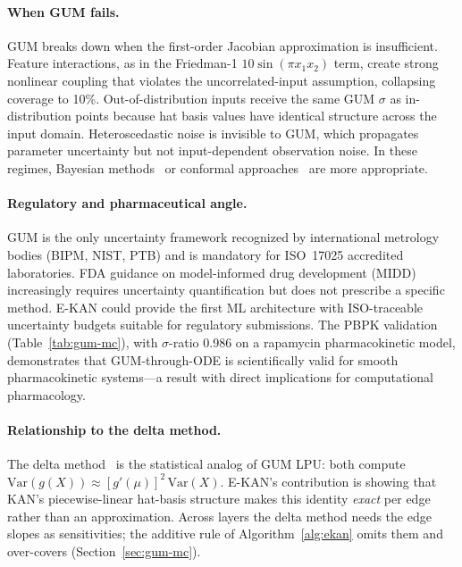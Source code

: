\documentclass{article}
\begin{document}
\paragraph{When GUM fails.}
GUM breaks down when the first-order Jacobian approximation is insufficient.
Feature interactions, as in the Friedman-1 $10\sin(\pi x_1 x_2)$ term,
create strong nonlinear coupling that violates the uncorrelated-input
assumption, collapsing coverage to 10\%.  Out-of-distribution inputs receive
the same GUM $\sigma$ as in-distribution points because hat basis values have
identical structure across the input domain.  Heteroscedastic noise is
invisible to GUM, which propagates parameter uncertainty but not
input-dependent observation noise.  In these regimes, Bayesian
methods~\citep{hassan2024bayeskan} or conformal
approaches~\citep{mollaali2025conformal} are more appropriate.

\paragraph{Regulatory and pharmaceutical angle.}
GUM is the only uncertainty framework recognized by international metrology
bodies (BIPM, NIST, PTB) and is mandatory for ISO~17025 accredited
laboratories.  FDA guidance on model-informed drug development (MIDD)
increasingly requires uncertainty quantification but does not prescribe a
specific method.  E-KAN could provide the first ML architecture with
ISO-traceable uncertainty budgets suitable for regulatory submissions.  The
PBPK validation (Table~\ref{tab:gum-mc}), with $\sigma$-ratio 0.986 on a
rapamycin pharmacokinetic model, demonstrates that GUM-through-ODE is
scientifically valid for smooth pharmacokinetic systems---a result with direct
implications for computational pharmacology.

\paragraph{Relationship to the delta method.}
The delta method~\citep{oehlert1992delta} is the statistical analog of GUM
LPU: both compute
$\mathrm{Var}(g(X)) \approx [g'(\mu)]^2 \,\mathrm{Var}(X)$.  E-KAN's
contribution is showing that KAN's piecewise-linear hat-basis structure makes
this identity \emph{exact} per edge rather than an approximation.  Across
layers the delta method needs the edge slopes as sensitivities; the additive
rule of Algorithm~\ref{alg:ekan} omits them and over-covers
(Section~\ref{sec:gum-mc}).
\end{document}
